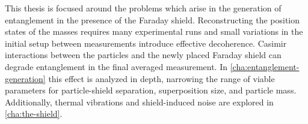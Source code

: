 This thesis is focused around the problems which arise in the generation of entanglement in the presence of the Faraday shield.
Reconstructing the position states of the masses requires many experimental runs and small variations in the initial setup between measurements introduce effective decoherence.
Casimir interactions between the particles and the newly placed Faraday shield can degrade entanglement in the final averaged measurement.
In \cref{cha:entanglement-generation} this effect is analyzed in depth, narrowing the range of viable parameters for particle-shield separation, superposition size, and particle mass.
Additionally, thermal vibrations and shield-induced noise are explored in \cref{cha:the-shield}.
